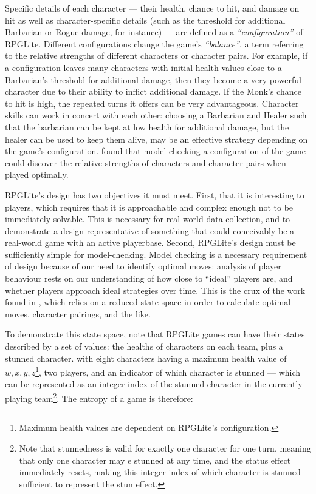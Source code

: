 Specific details of each character --- their health, chance to hit, and damage
on hit as well as character-specific details (such as the threshold for
additional Barbarian or Rogue damage, for instance) --- are defined as a
\emph{``configuration''} of RPGLite. Different configurations change the game's
\emph{``balance''}, a term referring to the relative strengths of different
characters or character pairs. For example, if a configuration leaves many
characters with initial health values close to a Barbarian's threshold for
additional damage, then they become a very powerful character due to their
ability to inflict additional damage. If the Monk's chance to hit is high, the
repeated turns it offers can be very advantageous. Character skills can work in
concert with each other: choosing a Barbarian and Healer such that the barbarian
can be kept at low health for additional damage, but the healer can be used to
keep them alive, may be an effective strategy depending on the game's
configuration. \citeauthor{kavanagh2020} found that model-checking a
configuration of the game could discover the relative strengths of characters
and character pairs when played optimally.

RPGLite's design has two objectives it must meet. First, that it is interesting
to players, which requires that it is approachable and complex enough not to be
immediately solvable. This is necessary for real-world data collection, and to
demonstrate a design representative of something that could conceivably be a
real-world game with an active playerbase. Second, RPGLite's design must be
sufficiently simple for model-checking. Model checking is a necessary
requirement of design because of our need to identify optimal moves: analysis of
player behaviour rests on our understanding of how close to ``ideal'' players
are, and whether players approach ideal strategies over time. This is the crux
of the work found in \cite{}, which relies on a reduced state space in order to calculate
optimal moves, character pairings, and the like.

To demonstrate this state space, note that RPGLite games can have their states
described by a set of values: the healths of characters on each team, plus a
stunned character. with eight characters having a maximum health value of $w, x,
y, z$\footnote{Maximum health values are dependent on RPGLite's configuration.},
two players, and an indicator of which character is stunned --- which can be
represented as an integer index of the stunned character in the
currently-playing team\footnote{Note that stunnedness is valid for exactly one
character for one turn, meaning that only one character may e stunned at any
time, and the status effect immediately resets, making this integer index of
which character is stunned sufficient to represent the stun effect.}. The
entropy of a game is therefore:

